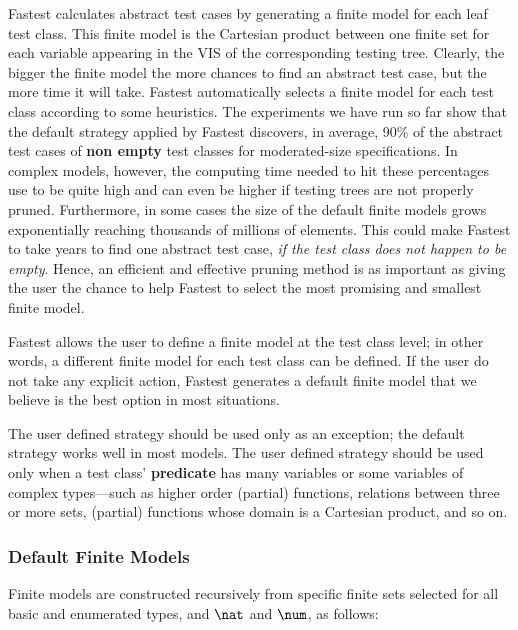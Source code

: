 Fastest calculates abstract test cases by generating a finite model for each leaf test class. This finite model is the Cartesian product between one finite set for each variable appearing in the VIS of the corresponding testing tree. Clearly, the bigger the finite model the more chances to find an abstract test case, but the more time it will take. Fastest automatically selects a finite model for each test class according to some heuristics. The experiments we have run so far show that the default strategy applied by Fastest discovers, in average, 90\% of the abstract test cases of {\bf non empty} test classes for moderated-size specifications. In complex models, however, the computing time needed to hit these percentages use to be quite high and can even be higher if testing trees are not properly pruned. Furthermore, in some cases the size of the default finite models grows exponentially reaching thousands of millions of elements. This could make Fastest to take years to find one abstract test case, {\it if the test class does not happen to be empty}. Hence, an efficient and effective pruning method is as important as giving the user the chance to help Fastest to select the most promising and smallest finite model.

Fastest allows the user to define a finite model at the test class level; in other words, a different finite model for each test class can be defined. If the user do not take any explicit action, Fastest generates a default finite model that we believe is the best option in most situations. 

\vspace{5mm} The user defined strategy should be used only as an exception; the default strategy works well in most models. The user defined strategy should be used only when a test class' {\bf predicate} has many variables or some variables of complex types---such as higher order (partial) functions, relations between three or more sets, (partial) functions whose domain is a Cartesian product, and so on.\vspace{5mm}

\subsubsection{\label{dfm}Default Finite Models}
Finite models are constructed recursively from specific finite sets selected for all basic and enumerated types, and $\nat$ and $\num$, as follows: 


